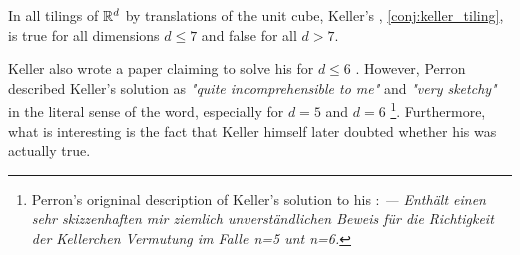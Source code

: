 \documentclass[../thesis.tex]{subfiles}
\begin{document}
\begin{theorem}
    In all tilings of $\mathbb{R}^d$ by translations of the unit cube, Keller's , \cref{conj:keller_tiling}, is true for all dimensions $d\leq 7$ and false for all $d>7$.
\end{theorem}

\begin{remark}
    Keller also wrote a paper claiming to solve his  for $d\leq 6$ \cite{Keller1937}. However, Perron described Keller's solution as \emph{"quite incomprehensible to me"} and \emph{"very sketchy"} in the literal sense of the word, especially for $d=5$ and $d=6$ \cite{perronUeberLueckenloseAusfuellung1940} \footnote[1]{Perron's origninal description of Keller's solution to his : \emph{— Enthält einen sehr skizzenhaften mir ziemlich unverständlichen Beweis für die Richtigkeit der Kellerchen Vermutung im Falle n=5 unt n=6.}}. Furthermore, what is interesting is the fact that Keller himself later doubted whether his  was actually true.
\end{remark}
\end{document}
